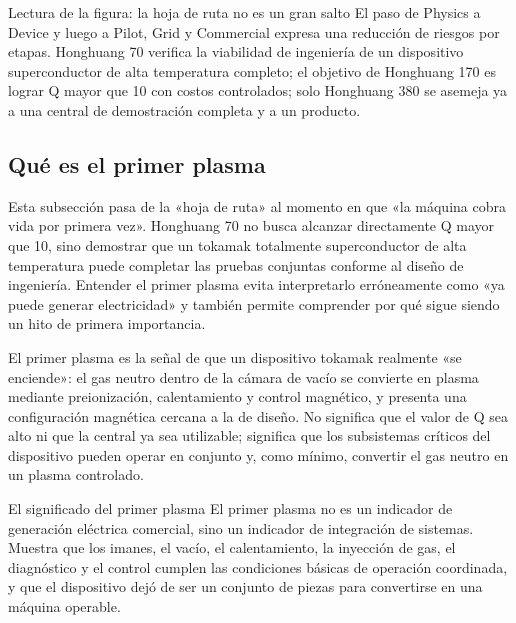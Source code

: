 \documentclass[a4paper]{article}
\begin{document}
\begin{knowledgebox}{Lectura de la figura: la hoja de ruta no es un gran salto}
El paso de Physics a Device y luego a Pilot, Grid y Commercial expresa una reducción de riesgos por etapas. Honghuang 70 verifica la viabilidad de ingeniería de un dispositivo superconductor de alta temperatura completo; el objetivo de Honghuang 170 es lograr Q mayor que 10 con costos controlados; solo Honghuang 380 se asemeja ya a una central de demostración completa y a un producto.
\end{knowledgebox}

\subsection{Qué es el primer plasma}

Esta subsección pasa de la «hoja de ruta» al momento en que «la máquina cobra vida por primera vez». Honghuang 70 no busca alcanzar directamente Q mayor que 10, sino demostrar que un tokamak totalmente superconductor de alta temperatura puede completar las pruebas conjuntas conforme al diseño de ingeniería. Entender el primer plasma evita interpretarlo erróneamente como «ya puede generar electricidad» y también permite comprender por qué sigue siendo un hito de primera importancia.

El primer plasma es la señal de que un dispositivo tokamak realmente «se enciende»: el gas neutro dentro de la cámara de vacío se convierte en plasma mediante preionización, calentamiento y control magnético, y presenta una configuración magnética cercana a la de diseño. No significa que el valor de Q sea alto ni que la central ya sea utilizable; significa que los subsistemas críticos del dispositivo pueden operar en conjunto y, como mínimo, convertir el gas neutro en un plasma controlado.

\begin{importantbox}{El significado del primer plasma}
El primer plasma no es un indicador de generación eléctrica comercial, sino un indicador de integración de sistemas. Muestra que los imanes, el vacío, el calentamiento, la inyección de gas, el diagnóstico y el control cumplen las condiciones básicas de operación coordinada, y que el dispositivo dejó de ser un conjunto de piezas para convertirse en una máquina operable.
\end{importantbox}
\end{document}
